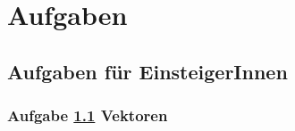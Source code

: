 \documentclass[
  11pt,
  a4paperpaper,
]{scrreprt}
\begin{document}
\normalsize

\newpage
\tableofcontents
\newpage
{}
\setcounter{page}{1}
\renewcommand\pagemark{{\usekomafont{pagenumber}\thepage\ von \pageref{LastPage}}}

\part{Aufgaben}

\chapter{Aufgaben für EinsteigerInnen}\label{sec-AufgabeAnfang}

\section{\texorpdfstring{Aufgabe \ref{sec-AAA01}
Vektoren}{Aufgabe  Vektoren}}\label{sec-AAA01}
\end{document}

